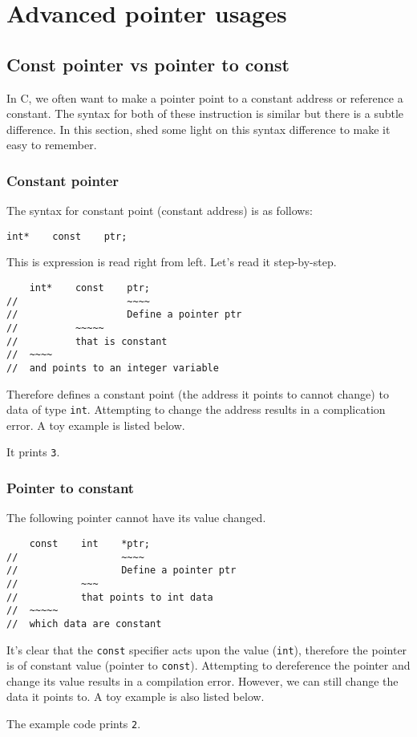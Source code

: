 \section{Advanced pointer usages}

\subsection{Const pointer vs pointer to const}
In C, we often want to make a pointer point to a constant address or reference a constant. The syntax for both of these instruction is similar but there is a subtle difference. In this section, shed some light on this syntax difference to make it easy to remember.

\subsubsection{Constant pointer}

The syntax for constant point (constant address) is as follows:
\begin{verbatim}
int*    const    ptr;
\end{verbatim}
This is expression is read right from left. Let's read it step-by-step.
\begin{verbatim}
    int*    const    ptr;
//                   ~~~~  
//                   Define a pointer ptr
//          ~~~~~
//          that is constant
//  ~~~~
//  and points to an integer variable
\end{verbatim}
Therefore defines a constant point (the address it points to cannot change) to data of type \texttt{int}. Attempting to change the address results in a complication error. A toy example is listed below.

It prints \texttt{3}.



\subsubsection{Pointer to constant}
The following pointer cannot have its value changed.
\begin{verbatim}
    const    int    *ptr;
//                  ~~~~ 
//                  Define a pointer ptr
//           ~~~
//           that points to int data
//  ~~~~~
//  which data are constant
\end{verbatim}
It's clear that the \texttt{const} specifier acts upon the value (\texttt{int}), therefore the pointer is of constant value (pointer to \texttt{const}). Attempting to dereference the pointer and change its value results in a compilation error. However, we can still change the data it points to. A toy example is also listed below.

The example code prints \texttt{2}.
